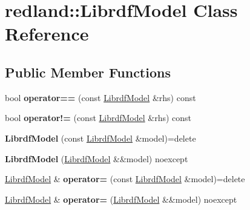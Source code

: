 \hypertarget{classredland_1_1LibrdfModel}{}\section{redland\+:\+:Librdf\+Model Class Reference}
\label{classredland_1_1LibrdfModel}
\subsection*{Public Member Functions}
\begin{DoxyCompactItemize}
\item 
\mbox{\label{classredland_1_1LibrdfModel_a1a8a3f9aad0520d6788aa2816ffb318e}} 
bool {\bfseries operator==} (const \hyperlink{classredland_1_1LibrdfModel}{Librdf\+Model} \&rhs) const
\item 
\mbox{\label{classredland_1_1LibrdfModel_a8cdaab0ea4c70808f015bfb6846b20bb}} 
bool {\bfseries operator!=} (const \hyperlink{classredland_1_1LibrdfModel}{Librdf\+Model} \&rhs) const
\item 
\mbox{\label{classredland_1_1LibrdfModel_a5a35c032585e38b1d41bc18f057128c1}} 
{\bfseries Librdf\+Model} (const \hyperlink{classredland_1_1LibrdfModel}{Librdf\+Model} \&model)=delete
\item 
\mbox{\label{classredland_1_1LibrdfModel_a583e0eaecfe167ccbbeac5d768bcd644}} 
{\bfseries Librdf\+Model} (\hyperlink{classredland_1_1LibrdfModel}{Librdf\+Model} \&\&model) noexcept
\item 
\mbox{\label{classredland_1_1LibrdfModel_a7bd07324b31fa8eb8f5f2e51b15044fc}} 
\hyperlink{classredland_1_1LibrdfModel}{Librdf\+Model} \& {\bfseries operator=} (const \hyperlink{classredland_1_1LibrdfModel}{Librdf\+Model} \&model)=delete
\item 
\mbox{\label{classredland_1_1LibrdfModel_a9007acfb92943e018d20d6985c811033}} 
\hyperlink{classredland_1_1LibrdfModel}{Librdf\+Model} \& {\bfseries operator=} (\hyperlink{classredland_1_1LibrdfModel}{Librdf\+Model} \&\&model) noexcept
\item 
\mbox{\label{classredland_1_1LibrdfModel_a8b7d3063e030ce8613dcd6def7463a5a}} 

\end{DoxyCompactItemize}
